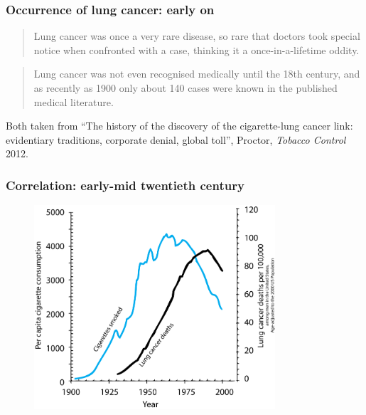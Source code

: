 \documentclass[handout]{beamer}
\begin{document}
\begin{frame}
	\frametitle{Occurrence of lung cancer: early on}
	
	\begin{quotation}
		Lung cancer was once a very rare disease, so rare that doctors took special notice when confronted with a case, thinking it a once-in-a-lifetime oddity.
	\end{quotation}
	
	\begin{quotation}
		Lung cancer was not even recognised medically until the 18th century, and as recently as 1900 only about 140 cases were known in the published medical literature.
	\end{quotation}
	
	\footnotesize Both taken from ``The history of the discovery of the cigarette-lung cancer link: evidentiary traditions, corporate denial, global toll'', Proctor, \textit{Tobacco Control} 2012.
	
\end{frame}

\begin{frame}
	\frametitle{Correlation: early-mid twentieth century}
	
	\begin{figure}[ht]
		\centerline{\includegraphics[width=0.8\textwidth]{../figures/smoking_cancer.png}}
	\end{figure}
	
\end{frame}
\end{document}
